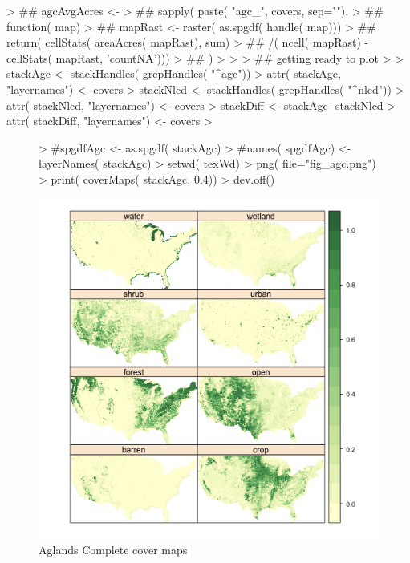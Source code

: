 \begin{Schunk}
\begin{Sinput}
> ## agcAvgAcres <-
> ##   sapply( paste( "agc_", covers, sep=""),
> ##          function( map) {
> ##            mapRast <- raster( as.spgdf( handle( map)))
> ##            return( cellStats( areaAcres( mapRast), sum)
> ##                   /( ncell( mapRast) - cellStats( mapRast, 'countNA')))
> ##          })
> 
>          
> ## getting ready to plot
> 
> stackAgc <- stackHandles( grepHandles(  "^agc"))
> attr( stackAgc, "layernames") <-  covers
> stackNlcd <- stackHandles( grepHandles( "^nlcd"))
> attr( stackNlcd, "layernames") <-  covers
> stackDiff <- stackAgc -stackNlcd
> attr( stackDiff, "layernames") <-  covers
> 
\end{Sinput}
\end{Schunk}

\begin{figure} 
\begin{center} 

\begin{Schunk}
\begin{Sinput}
> #spgdfAgc <- as.spgdf( stackAgc)
> #names( spgdfAgc) <- layerNames( stackAgc)
> setwd( texWd)
> png( file="fig_agc.png")
> print( coverMaps( stackAgc, 0.4))
> dev.off()
\end{Sinput}
\end{Schunk}

\includegraphics{fig_agc}
\end{center} 
\caption{Aglands Complete cover maps} 
\label{fig:agc} 
\end{figure} 

